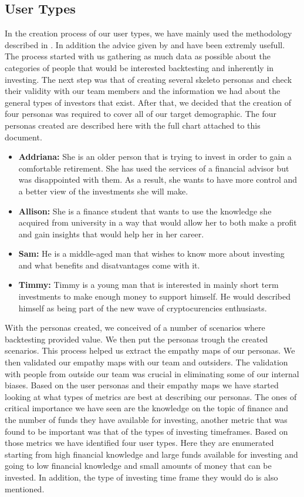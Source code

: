 \documentclass[main.tex]{subfiles}
\begin{document}
\subsection{User Types}
In the creation process of our user types, we have mainly used the methodology described in \cite{pathy}. In addition the advice given by \cite{uiux_fundation} and \cite{user_types_interaction_design_fundation} have been extremly usefull. The process started with us gathering as much data as possible about the categories of people that would be interested backtesting and inherently in investing. The next step was that of creating several skeleto personas \cite{personas} and check their validity with our team members and the information we had about the general types of investors that exist. After that, we decided that the creation of four personas  was required to cover all of our target demographic. 
The four personas created are described here with the full chart attached to this document.
\begin{itemize}
\item \textbf{Addriana: }She is an older person that is trying to invest in order to gain a comfortable retirement. She has used the services of a financial advisor but was disappointed with them. As a result, she wants to have more control and a better view of the investments she will make.
\item \textbf{Allison: }She is a finance student that wants to use the knowledge she acquired from university in a way that would allow her to both make a profit and gain insights that would help her in her career.
\item\textbf{Sam: }He is a middle-aged man that wishes to know more about investing and what benefits and disatvantages come with it. 
\item\textbf{Timmy: }Timmy is a young man that is interested in mainly short term investments to make enough money to support himself. He would described himself as being part of the new wave of cryptocurencies enthusiasts.
\end{itemize}

With the personas created, we conceived of a number of scenarios where backtesting provided value. We then put the personas trough the created scenarios. This process helped us extract the  empathy maps \cite{empathy_maps} of our personas. We then validated our empathy maps with our team and outsiders. The validation with people from outside our team was crucial in eliminating some of our internal biases.
Based on the user personas and their empathy maps we have started looking at what types of metrics are best at describing our personas. The ones of critical importance we have seen are the knowledge on the topic of finance and the number of funds they have available for investing, another metric that was found to be important was that of the types of investing timeframes. Based on those metrics we have identified four user types. Here they are enumerated starting from high financial knowledge and large funds available for investing and going to low financial knowledge and small amounts of money that can be invested. In addition, the type of investing time frame they would do is also mentioned.
\end{document}
